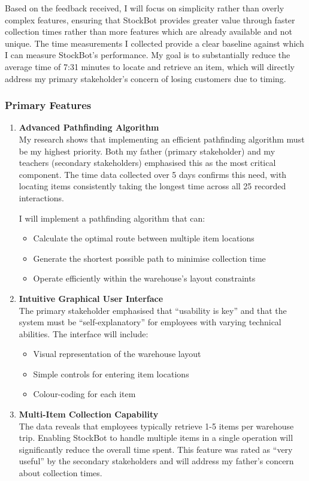 Based on the feedback received, I will focus on simplicity rather than overly complex features, ensuring that StockBot provides greater value through faster collection times rather than more features which are already available and not unique. The time measurements I collected provide a clear baseline against which I can measure StockBot's performance. My goal is to substantially reduce the average time of 7:31 minutes to locate and retrieve an item, which will directly address my primary stakeholder's concern of losing customers due to timing.

\subsubsection{Primary Features}

\begin{enumerate}
    \item \textbf{Advanced Pathfinding Algorithm}\\
    My research shows that implementing an efficient pathfinding algorithm must be my highest priority. Both my father (primary stakeholder) and my teachers (secondary stakeholders) emphasised this as the most critical component. The time data collected over 5 days confirms this need, with locating items consistently taking the longest time across all 25 recorded interactions.
    
    I will implement a pathfinding algorithm that can:
    \begin{itemize}
        \item Calculate the optimal route between multiple item locations
        \item Generate the shortest possible path to minimise collection time
        \item Operate efficiently within the warehouse's layout constraints
    \end{itemize}
    
    \item \textbf{Intuitive Graphical User Interface}\\
    The primary stakeholder emphasised that ``usability is key'' and that the system must be ``self-explanatory'' for employees with varying technical abilities. The interface will include:
    \begin{itemize}
        \item Visual representation of the warehouse layout
        \item Simple controls for entering item locations
        \item Colour-coding for each item
    \end{itemize}
    
    \item \textbf{Multi-Item Collection Capability}\\
    The data reveals that employees typically retrieve 1-5 items per warehouse trip. Enabling StockBot to handle multiple items in a single operation will significantly reduce the overall time spent. This feature was rated as ``very useful'' by the secondary stakeholders and will address my father's concern about collection times.
\end{enumerate}

